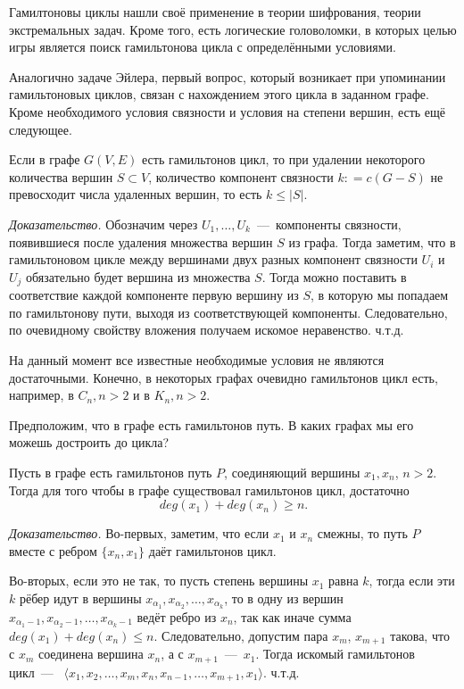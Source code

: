 	Гамилтоновы циклы нашли своё применение в теории шифрования, теории экстремальных задач. Кроме того, есть логические головоломки, в которых целью игры является поиск гамильтонова цикла с определёнными условиями.
	
	Аналогично задаче Эйлера, первый вопрос, который возникает при упоминании гамильтоновых циклов, связан с нахождением этого цикла в заданном графе. Кроме необходимого условия связности и условия на степени вершин, есть ещё следующее.
	
\begin{statement}
	Если в графе $G(V, E)$ есть гамильтонов цикл, то при удалении некоторого количества вершин $S \subset V$, количество компонент связности $k \colon= c(G-S)$ не превосходит числа удаленных вершин, то есть $k \leqslant |S|$.
	
	\emph{Доказательство.} Обозначим через $U_1, \dots, U_k$~---~компоненты связности, появившиеся после удаления множества вершин $S$ из графа. Тогда заметим, что в гамильтоновом цикле между вершинами двух разных компонент связности $U_i$ и $U_j$ обязательно будет вершина из множества $S$. Тогда можно поставить в соответствие каждой компоненте первую вершину из $S$, в которую мы попадаем по гамильтонову пути, выходя из соответствующей компоненты. Следовательно, по очевидному свойству вложения получаем искомое неравенство. ч.т.д.
\end{statement}

	На данный момент все известные необходимые условия не являются достаточными. Конечно, в некоторых графах очевидно гамильтонов цикл есть, например, в $C_n, n > 2$ и в $K_n, n > 2$.
	
	Предположим, что в графе есть гамильтонов путь. В каких графах мы его можешь достроить до цикла?
	
\begin{statement}
	Пусть в графе есть гамильтонов путь $P$, соединяющий вершины $x_1, x_n$, $n > 2$. Тогда для того чтобы в графе существовал гамильтонов цикл, достаточно $$deg(x_1)+deg(x_n) \geqslant n.$$
	
	\emph{Доказательство.} Во-первых, заметим, что если $x_1$ и $x_n$ смежны, то путь $P$ вместе с ребром $\lbrace x_n, x_1 \rbrace$ даёт гамильтонов цикл.
	
	Во-вторых, если это не так, то пусть степень вершины $x_1$ равна $k$, тогда если эти $k$ рёбер идут в вершины $x_{\alpha_1}, x_{\alpha_2}, \dots, x_{\alpha_k}$, то в одну из вершин $x_{\alpha_1 - 1}, x_{\alpha_2 - 1}, \dots, x_{\alpha_k - 1}$ ведёт ребро из $x_n$, так как иначе сумма $deg(x_1)+deg(x_n) \leqslant n$. Следовательно, допустим пара $x_m$, $x_{m+1}$ такова, что с $x_m$ соединена вершина $x_n$, а с $x_{m+1}$~---~$x_1$. Тогда искомый гамильтонов цикл~---~ $\langle x_1, x_2, \dots, x_m, x_n, x_{n-1}, \dots, x_{m+1}, x_1\rangle$. ч.т.д.
\end{statement}

